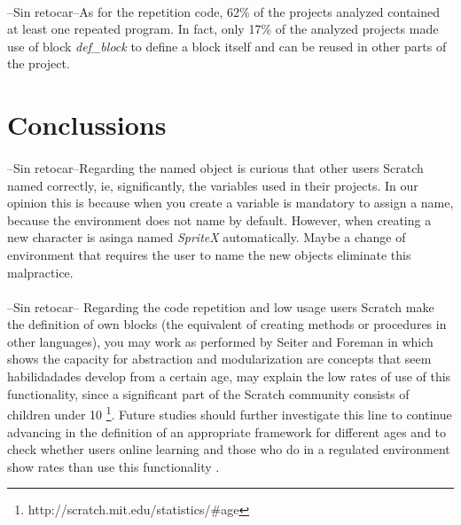 \documentclass[a4paper,10pt]{article}
\begin{document}
\paragraph{}--Sin retocar--As for the repetition code, 62\% of the projects analyzed contained at least one repeated program. In fact, only 17\% of the analyzed projects made use of block \textit{def\_block} to define a block itself and can be reused in other parts of the project. 

\section{Conclussions}

\paragraph{} --Sin retocar--Regarding the named object is curious that other users Scratch named correctly, ie, significantly, the variables used in their projects. In our opinion this is because when you create a variable is mandatory to assign a name, because the environment does not name by default. However, when creating a new character is asinga named \textit{SpriteX} automatically. Maybe a change of environment that requires the user to name the new objects eliminate this malpractice.
\paragraph{} --Sin retocar-- Regarding the code repetition and low usage users Scratch make the definition of own blocks (the equivalent of creating methods or procedures in other languages), you may work as performed by Seiter and Foreman \cite {seiter2013modeling} in which shows the capacity for abstraction and modularization are concepts that seem habilidadades develop from a certain age, may explain the low rates of use of this functionality, since a significant part of the Scratch community consists of children under 10 \footnote{http://scratch.mit.edu/statistics/\#age}. Future studies should further investigate this line to continue advancing in the definition of an appropriate framework for different ages and to check whether users online learning and those who do in a regulated environment show rates than use this functionality .

\newpage


\end{document}
